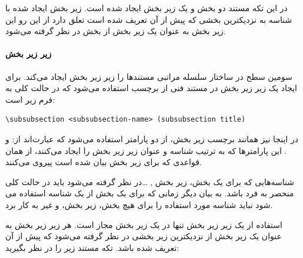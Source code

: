 در این تکه مستند دو بخش و یک زیر بخش ایجاد شده است. زیر بخش ایجاد شده با شناسه
 به نزدیکترین بخشی که پیش از آن تعریف شده است تعلق دارد از این
رو این زیر بخش به عنوان یک زیر بخش از بخش  در نظر گرفته می‌شود.

\paragraph{زیر زیر بخش}

سومین سطح در ساختار سلسله مراتبی مستندها را زیر زیر
بخش ایجاد می‌کند. برای ایجاد یک زیر زیر بخش در مستند
فنی از برچسب  استفاده می‌شود که در حالت کلی به فرم زیر است:

\begin{latin}
\lstset{language=C++}  
\begin{lstlisting}[frame=single] 
\subsubsection <subsubsection-name> (subsubsection title)
\end{lstlisting}
\end{latin}

در اینجا نیز همانند برچسب زیر بخش، از دو پارامتر استفاده می‌شود که عبارت‌اند از:
 و . این پارامترها که به ترتیب
شناسه و عنوان زیر زیر بخش را ایجاد می‌کنند، از همان قواعدی که برای زیر بخش بیان
شده است پیروی می‌کنند.

\begin{warning}
شناسه‌هایی که برای یک بخش، زیر بخش , \ldots در نظر گرفته می‌شود باید در حالت کلی
منحصر به فرد باشد. به بیان دیگر زمانی که برای یک بخش از یک شناسه استفاده می شود
نباید شناسه مورد استفاده را برای هیچ بخش، زیر بخش، و غیر به کار برد.
\end{warning}

استفاده از یک زیر زیر بخش تنها در یک زیر بخش مجاز است. هر زیر زیر بخش به عنوان
یک زیر بخش از نزدیکترین زیر بخشی در نظر گرفته می‌شود که پیش از آن تعریف شده
باشد. تکه مستند زیر را در نظر بگیرید:

